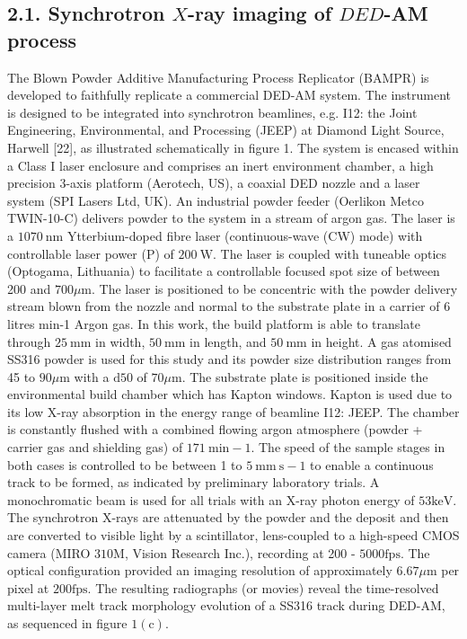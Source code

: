 \documentclass[10pt]{article}
\begin{document}
\subsection*{2.1. Synchrotron $X$-ray imaging of $D E D$-AM process}
The Blown Powder Additive Manufacturing Process Replicator (BAMPR) is developed to faithfully replicate a commercial DED-AM system. The instrument is designed to be integrated into synchrotron beamlines, e.g. I12: the Joint Engineering, Environmental, and Processing (JEEP) at Diamond Light Source, Harwell [22], as illustrated schematically in figure 1. The system is encased within a Class I laser enclosure and comprises an inert environment chamber, a high precision 3-axis platform (Aerotech, US), a coaxial DED nozzle and a laser system (SPI Lasers Ltd, UK). An industrial powder feeder (Oerlikon Metco TWIN-10-C) delivers powder to the system in a stream of argon gas. The laser is a $1070 \mathrm{~nm}$ Ytterbium-doped fibre laser (continuous-wave (CW) mode) with controllable laser power (P) of $200 \mathrm{~W}$. The laser is coupled with tuneable optics (Optogama, Lithuania) to facilitate a controllable focused spot size of between 200 and $700 \mu \mathrm{m}$. The laser is positioned to be concentric with the powder delivery stream blown from the nozzle and normal to the substrate plate in a carrier of 6 litres min-1 Argon gas. In this work, the build platform is able to translate through $25 \mathrm{~mm}$ in width, $50 \mathrm{~mm}$ in length, and $50 \mathrm{~mm}$ in height. A gas atomised SS316 powder is used for this study and its powder size distribution ranges from 45 to $90 \mu \mathrm{m}$ with a $\mathrm{d} 50$ of $70 \mu \mathrm{m}$. The substrate plate is positioned inside the environmental build chamber which has Kapton windows. Kapton is used due to its low X-ray absorption in the energy range of beamline I12: JEEP. The chamber is constantly flushed with a combined flowing argon atmosphere (powder + carrier gas and shielding gas) of $171 \mathrm{~min}-1$. The speed of the sample stages in both cases is controlled to be between 1 to $5 \mathrm{~mm} \mathrm{~s}-1$ to enable a continuous track to be formed, as indicated by preliminary laboratory trials. A monochromatic beam is used for all trials with an X-ray photon energy of $53 \mathrm{keV}$. The synchrotron X-rays are attenuated by the powder and the deposit and then are converted to visible light by a scintillator, lens-coupled to a high-speed CMOS camera (MIRO $310 \mathrm{M}$, Vision Research Inc.), recording at 200 - $5000 \mathrm{fps}$. The optical configuration provided an imaging resolution of approximately $6.67 \mu \mathrm{m}$ per pixel at $200 \mathrm{fps}$. The resulting radiographs (or movies) reveal the time-resolved multi-layer melt track morphology evolution of a SS316 track during DED-AM, as sequenced in figure $1(\mathrm{c})$.
\end{document}
